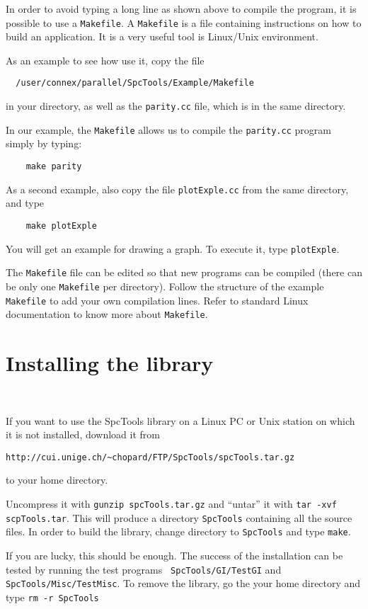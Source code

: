 \documentclass[12pt,a4paper]{article}
\begin{document}
In order to avoid typing a long line as shown above to compile the
program, it is possible to use a {\tt Makefile}. A {\tt Makefile} is a
file containing instructions on how to build an application. It is a
very useful tool is Linux/Unix environment.  

As an example to see how use it, copy the
file
\begin{verbatim}
  /user/connex/parallel/SpcTools/Example/Makefile
\end{verbatim}
in your directory, as well as the {\tt parity.cc} file, which is in
the same directory.

In our example, the {\tt Makefile} allows us to compile the {\tt parity.cc} program simply by typing:
\begin{verbatim}
    make parity
\end{verbatim}

As a second example, also copy the file {\tt plotExple.cc} from the same
directory, and type 
\begin{verbatim}
    make plotExple
\end{verbatim}
You will  get an example for drawing a graph. To execute it,
type {\tt plotExple}.

The {\tt Makefile} file can be edited so that new programs can be
compiled (there can be only one {\tt Makefile} per directory). Follow
the structure of the example {\tt Makefile} to add your own
compilation lines. Refer to standard Linux documentation to know more about {\tt Makefile}.

\section{Installing the library}~\label{sect:downloading}

If you want to use the SpcTools library on a Linux PC or Unix station
on which it is not installed, download it from 
\begin{verbatim}
http://cui.unige.ch/~chopard/FTP/SpcTools/spcTools.tar.gz
\end{verbatim} 
to your home directory.

Uncompress it with {\tt gunzip spcTools.tar.gz} and ``untar'' it with
{\tt tar -xvf scpTools.tar}. This will produce a directory {\tt SpcTools} containing
all the source files. In order to build the library, change directory to {\tt SpcTools}
and type {\tt make}. 

If you are lucky, this should be enough. The success of the
installation can be tested by running the test programs {\tt
SpcTools/GI/TestGI} and {\tt SpcTools/Misc/TestMisc}.
To remove the library, go the your home directory and type {\tt rm -r SpcTools}
\end{document}
